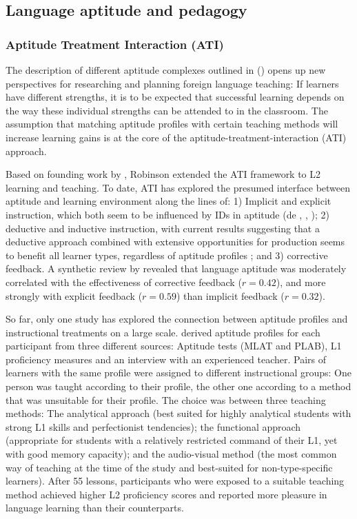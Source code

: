 \documentclass[output=paper]{langscibook}
\begin{document}
\subsection{Language aptitude and pedagogy}\label{sec:01:2.4}%

\subsubsection{Aptitude Treatment Interaction (ATI)}\label{sec:01:2.4.1} %

The description of different aptitude complexes outlined in  (\citealt{Robinson2001,Robinson2002}) opens up new perspectives for researching and planning foreign language teaching: If learners have different strengths, it is to be expected that successful learning depends on the way these individual strengths can be attended to in the classroom. The assumption that matching aptitude profiles with certain teaching methods will increase learning gains is at the core of the aptitude-treatment-interaction (ATI) approach. 

Based on founding work by \citet{Snow1991}, Robinson extended the ATI framework to L2 learning and teaching. To date, ATI has explored the presumed interface between aptitude and learning environment along the lines of: 1) Implicit and explicit instruction, which both seem to be influenced by IDs in aptitude (de \citealt{Graaff1997}, \citealt{Robinson1997}, \citealt{Williams1999}); 2) deductive and inductive instruction, with current results suggesting that a deductive approach combined with extensive opportunities for production seems to benefit all learner types, regardless of aptitude profiles \citep{Erlam2005}; and 3) corrective feedback. A synthetic review by \citet{Li2017} revealed that language aptitude was moderately correlated with the effectiveness of corrective feedback ($r=0.42$), and more strongly with explicit feedback ($r=0.59$) than implicit feedback ($r=0.32$).

So far, only one study has explored the connection between aptitude profiles and instructional treatments on a large scale. \citet{Wesche1981} derived aptitude profiles for each participant from three different sources: Aptitude tests (MLAT and PLAB), L1 proficiency measures and an interview with an experienced teacher. Pairs of learners with the same profile were assigned to different instructional groups: One person was taught according to their profile, the other one according to a method that was unsuitable for their profile. The choice was between three teaching methods: The analytical approach (best suited for highly analytical students with strong L1 skills and perfectionist tendencies); the functional approach (appropriate for students with a relatively restricted command of their L1, yet with good memory capacity); and the audio-visual method (the most common way of teaching at the time of the study and best-suited for non-type-specific learners). After 55 lessons, participants who were exposed to a suitable teaching method achieved higher L2 proficiency scores and reported more pleasure in language learning than their counterparts. 
\end{document}
